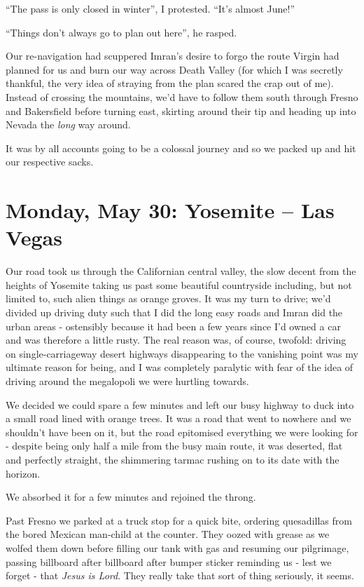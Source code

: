 \documentclass[a5paper,titlepage,draft]{book}
\begin{document}
``The pass is only closed in winter'', I protested.  ``It's almost June!''

``Things don't always go to plan out here'', he rasped.

Our re-navigation had scuppered Imran's desire to forgo the route Virgin had planned for us and burn our way across Death Valley (for which I was secretly thankful, the very idea of straying from the plan scared the crap out of me).  Instead of crossing the mountains, we'd have to follow them south through Fresno and Bakersfield before turning east, skirting around their tip and heading up into Nevada the \emph{long} way around.

It was by all accounts going to be a colossal journey and so we packed up and hit our respective sacks.

\chapter[Yosemite -- Las Vegas]{Monday, May 30: Yosemite -- Las Vegas}
Our road took us through the Californian central valley, the slow decent from the heights of Yosemite taking us past some beautiful countryside including, but not limited to, such alien things as orange groves.  It was my turn to drive; we'd divided up driving duty such that I did the long easy roads and Imran did the urban areas - ostensibly because it had been a few years since I'd owned a car and was therefore a little rusty.  The real reason was, of course, twofold: driving on single-carriageway desert highways disappearing to the vanishing point was my ultimate reason for being, and I was completely paralytic with fear of the idea of driving around the megalopoli we were hurtling towards.

We decided we could spare a few minutes and left our busy highway to duck into a small road lined with orange trees.  It was a road that went to nowhere and we shouldn't have been on it, but the road epitomised everything we were looking for - despite being only half a mile from the busy main route, it was deserted, flat and perfectly straight, the shimmering tarmac rushing on to its date with the horizon.

We absorbed it for a few minutes and rejoined the throng.

Past Fresno we parked at a truck stop for a quick bite, ordering quesadillas from the bored Mexican man-child at the counter.  They oozed with grease as we wolfed them down before filling our tank with gas and resuming our pilgrimage, passing billboard after billboard after bumper sticker reminding us - lest we forget - that \emph{Jesus is Lord}.  They really take that sort of thing seriously, it seems.
\end{document}
